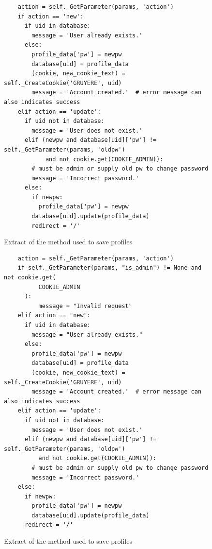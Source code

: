 \documentclass[a4paper, 12pt]{article}
\begin{document}
\begin{figure}[H]
        \begin{verbatim}
    action = self._GetParameter(params, 'action')
    if action == 'new':
      if uid in database:
        message = 'User already exists.'
      else:
        profile_data['pw'] = newpw
        database[uid] = profile_data
        (cookie, new_cookie_text) = self._CreateCookie('GRUYERE', uid)
        message = 'Account created.'  # error message can also indicates success
    elif action == 'update':
      if uid not in database:
        message = 'User does not exist.'
      elif (newpw and database[uid]['pw'] != self._GetParameter(params, 'oldpw')
            and not cookie.get(COOKIE_ADMIN)):
        # must be admin or supply old pw to change password
        message = 'Incorrect password.'
      else:
        if newpw:
          profile_data['pw'] = newpw
        database[uid].update(profile_data)
        redirect = '/'

        \end{verbatim}
    \caption{Extract of the method used to save profiles}
    \label{fig:ElevationIssue}
\end{figure}

\begin{figure}[H]
        \begin{verbatim}
    action = self._GetParameter(params, 'action')
    if self._GetParameter(params, "is_admin") != None and not cookie.get(
          COOKIE_ADMIN
      ):
          message = "Invalid request"
    elif action == "new":
      if uid in database:
        message = "User already exists."       
      else:
        profile_data['pw'] = newpw
        database[uid] = profile_data
        (cookie, new_cookie_text) = self._CreateCookie('GRUYERE', uid)
        message = 'Account created.'  # error message can also indicates success
    elif action == 'update':
      if uid not in database:
        message = 'User does not exist.'
      elif (newpw and database[uid]['pw'] != self._GetParameter(params, 'oldpw')
          and not cookie.get(COOKIE_ADMIN)):
        # must be admin or supply old pw to change password
        message = 'Incorrect password.'
    else:
      if newpw:
        profile_data['pw'] = newpw
        database[uid].update(profile_data)
      redirect = '/'

        \end{verbatim}
    \caption{Extract of the method used to save profiles}
    \label{fig:ElevationFix}
\end{figure}
\end{document}

